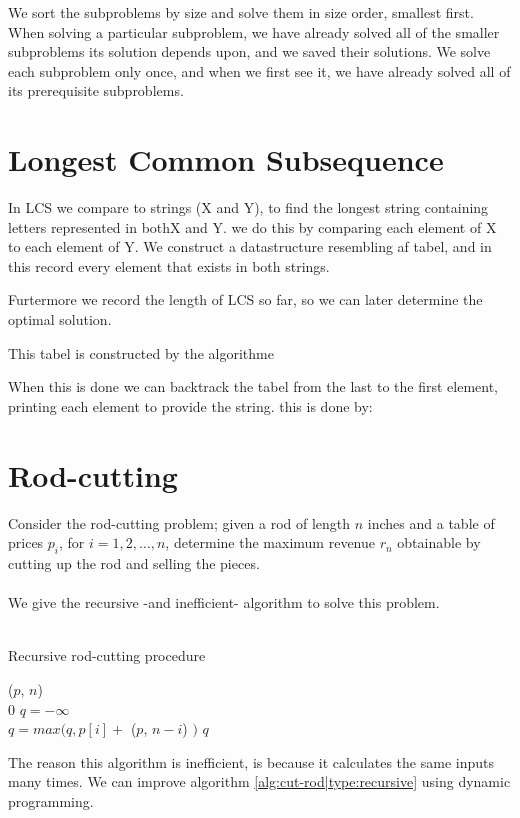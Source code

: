 We sort the subproblems by size and solve them in size order, smallest first.
When solving a particular subproblem, we have already solved all of the
smaller subproblems its solution depends upon, and we saved their solutions.
We solve each subproblem only once, and when we first see it, we have already
solved all of its prerequisite subproblems.

\newpage
\section{Longest Common Subsequence}
In LCS we compare to strings (X and Y), to find the longest string containing letters represented in bothX and Y.
we do this by comparing each element of X to each element of Y.
We construct a datastructure resembling af tabel, and in this record every element that exists in both strings.


Furtermore we record the length of LCS so far, so we can later determine the optimal solution.

This tabel is constructed by the algorithme 


When this is done we can backtrack the tabel from the last to the first element, printing each element to provide the string.
this is done by:


\section{Rod-cutting}
Consider the rod-cutting problem; given a rod of length $n$ inches and a table
of prices $p_i$, for $i = 1, 2, \dots, n$, determine the maximum revenue $r_n$
obtainable by cutting up the rod and selling the pieces.
\\\\
We give the recursive -and inefficient- algorithm to solve this problem. \\\\
\begin{algorithm}[H]
	\caption{Recursive rod-cutting procedure}
	\label{alg:cut-rod|type:recursive}
	
	
	
	
	\BlankLine
	\CutRod($p$, $n$) \\
	\Begin
	{
		{
			\Return $0$
		}
		$q = -\infty$ \\
		{
			$q = max(q, p[i] + $ \CutRod($p$, $n-i$) $)$
		}
		\Return $q$
	}
\end{algorithm}
The reason this algorithm is inefficient, is because it calculates the same
inputs many times. We can improve algorithm \ref{alg:cut-rod|type:recursive}
using dynamic programming.

